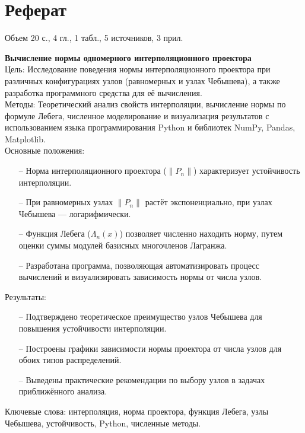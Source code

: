 \documentclass[14pt,openany,a4paper,oneside]{extarticle}
\begin{document}
	\setcounter{page}{2}
	\section*{Реферат}
	\thispagestyle{empty}
	
	Объем 20 с., 4 гл., 1 табл., 5 источников, 3 прил.
	
	\textbf{Вычисление нормы одномерного интерполяционного проектора}\\
	Цель: Исследование поведения нормы интерполяционного проектора при различных конфигурациях узлов (равномерных и узлах Чебышева), а также разработка программного средства для её вычисления.\\
	Методы: Теоретический анализ свойств интерполяции, вычисление нормы по формуле Лебега, численное моделирование и визуализация результатов с использованием языка программирования Python и библиотек NumPy, Pandas, Matplotlib.\\
	Основные положения: 
	\begin{enumerate}
		\item[--] Норма интерполяционного проектора ($\|P_n\|$) характеризует устойчивость интерполяции.
		\item[--] При равномерных узлах $\|P_n\|$ растёт экспоненциально, при узлах Чебышева — логарифмически.
		\item[--] Функция Лебега ($\Lambda_n(x)$) позволяет численно находить норму, путем оценки суммы модулей базисных многочленов Лагранжа.
		\item[--] Разработана программа, позволяющая автоматизировать процесс вычислений и визуализировать зависимость нормы от числа узлов.
	\end{enumerate}
	Результаты:
	\begin{enumerate}
		\item[--] Подтверждено теоретическое преимущество узлов Чебышева для повышения устойчивости интерполяции.
		\item[--] Построены графики зависимости нормы проектора от числа узлов для обоих типов распределений.
		\item[--] Выведены практические рекомендации по выбору узлов в задачах приближённого анализа.
	\end{enumerate}
	Ключевые слова: интерполяция, норма проектора, функция Лебега, узлы Чебышева, устойчивость, Python, численные методы. 
	
	\newpage
	\def\contentsname{Содержание}
	
	\tableofcontents
	
\end{document}

